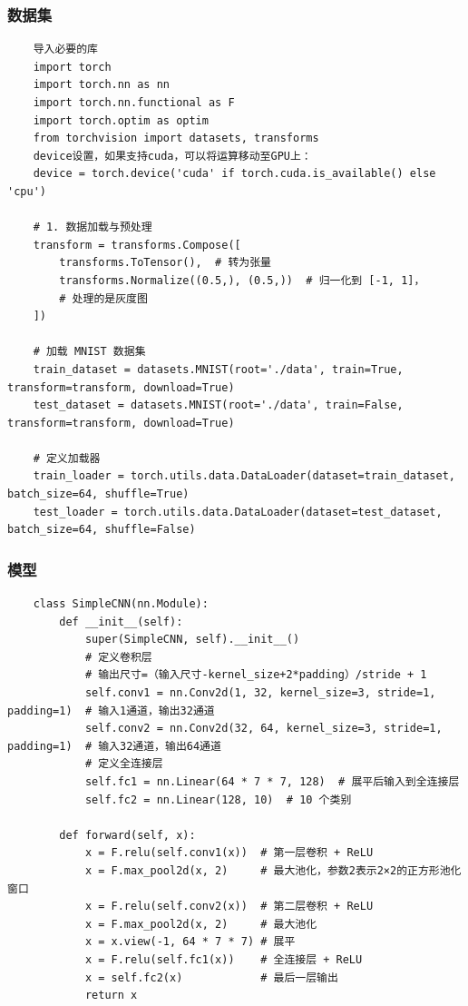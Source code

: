 \documentclass[UTF8]{ctexart}
\begin{document}
\subsubsection{数据集}
\begin{verbatim}
	导入必要的库
	import torch
	import torch.nn as nn
	import torch.nn.functional as F
	import torch.optim as optim
	from torchvision import datasets, transforms
	device设置，如果支持cuda，可以将运算移动至GPU上：
	device = torch.device('cuda' if torch.cuda.is_available() else 'cpu')

	# 1. 数据加载与预处理
	transform = transforms.Compose([
		transforms.ToTensor(),  # 转为张量
		transforms.Normalize((0.5,), (0.5,))  # 归一化到 [-1, 1]，
		# 处理的是灰度图
	])

	# 加载 MNIST 数据集
	train_dataset = datasets.MNIST(root='./data', train=True, transform=transform, download=True)
	test_dataset = datasets.MNIST(root='./data', train=False, transform=transform, download=True)

	# 定义加载器
	train_loader = torch.utils.data.DataLoader(dataset=train_dataset, batch_size=64, shuffle=True)
	test_loader = torch.utils.data.DataLoader(dataset=test_dataset, batch_size=64, shuffle=False)

\end{verbatim}


\subsubsection{模型}
\begin{verbatim}
	class SimpleCNN(nn.Module):
		def __init__(self):
			super(SimpleCNN, self).__init__()
			# 定义卷积层
			# 输出尺寸=（输入尺寸-kernel_size+2*padding）/stride + 1
			self.conv1 = nn.Conv2d(1, 32, kernel_size=3, stride=1, padding=1)  # 输入1通道，输出32通道
			self.conv2 = nn.Conv2d(32, 64, kernel_size=3, stride=1, padding=1)  # 输入32通道，输出64通道
			# 定义全连接层
			self.fc1 = nn.Linear(64 * 7 * 7, 128)  # 展平后输入到全连接层
			self.fc2 = nn.Linear(128, 10)  # 10 个类别

		def forward(self, x):
			x = F.relu(self.conv1(x))  # 第一层卷积 + ReLU
			x = F.max_pool2d(x, 2)     # 最大池化，参数2表示2×2的正方形池化窗口
			x = F.relu(self.conv2(x))  # 第二层卷积 + ReLU
			x = F.max_pool2d(x, 2)     # 最大池化
			x = x.view(-1, 64 * 7 * 7) # 展平
			x = F.relu(self.fc1(x))    # 全连接层 + ReLU
			x = self.fc2(x)            # 最后一层输出
			return x
\end{verbatim}
\end{document}

